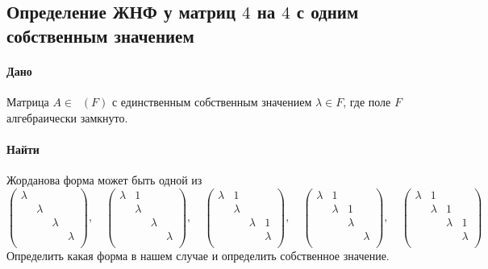 \documentclass{article}
\newcommand{\Matrix}[2]{\mathop{\mathrm{M}_{#2}}(#1)}
\begin{document}
\subsection{Определение ЖНФ у матриц $4$ на $4$ с одним собственным значением}

\paragraph{Дано} Матрица $A\in \Matrix{F}{4}$ с единственным собственным значением $\lambda\in F$, где поле $F$ алгебраически замкнуто.

\paragraph{Найти} Жорданова форма может быть одной из
\[
\begin{pmatrix}
{\lambda}&{}&{}&{}\\
{}&{\lambda}&{}&{}\\
{}&{}&{\lambda}&{}\\
{}&{}&{}&{\lambda}\\
\end{pmatrix}
,\quad
\begin{pmatrix}
{\lambda}&{1}&{}&{}\\
{}&{\lambda}&{}&{}\\
{}&{}&{\lambda}&{}\\
{}&{}&{}&{\lambda}\\
\end{pmatrix}
,\quad
\begin{pmatrix}
{\lambda}&{1}&{}&{}\\
{}&{\lambda}&{}&{}\\
{}&{}&{\lambda}&{1}\\
{}&{}&{}&{\lambda}\\
\end{pmatrix}
,\quad
\begin{pmatrix}
{\lambda}&{1}&{}&{}\\
{}&{\lambda}&{1}&{}\\
{}&{}&{\lambda}&{}\\
{}&{}&{}&{\lambda}\\
\end{pmatrix}
,\quad
\begin{pmatrix}
{\lambda}&{1}&{}&{}\\
{}&{\lambda}&{1}&{}\\
{}&{}&{\lambda}&{1}\\
{}&{}&{}&{\lambda}\\
\end{pmatrix}
\]
Определить какая форма в нашем случае и определить собственное значение.
\end{document}
